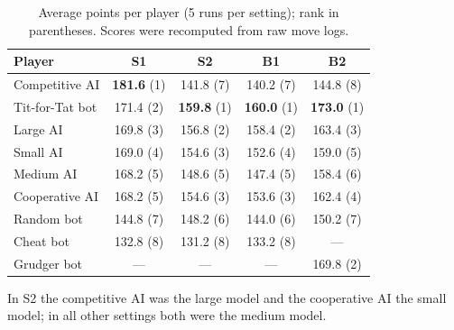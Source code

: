 \documentclass[11pt,a4paper]{article}
\begin{document}
\begin{table}[htbp]
\centering
\caption{Average points per player (5 runs per setting); rank in parentheses. Scores were recomputed from raw move logs.}
\small
\begin{tabular}{@{}lcccc@{}}
\toprule
Player & S1 & S2 & B1 & B2 \\
\midrule
Competitive AI    & \textbf{181.6} (1) & 141.8 (7) & 140.2 (7) & 144.8 (8) \\
Tit-for-Tat bot   & 171.4 (2) & \textbf{159.8} (1) & \textbf{160.0} (1) & \textbf{173.0} (1) \\
Large AI          & 169.8 (3) & 156.8 (2) & 158.4 (2) & 163.4 (3) \\
Small AI          & 169.0 (4) & 154.6 (3) & 152.6 (4) & 159.0 (5) \\
Medium AI         & 168.2 (5) & 148.6 (5) & 147.4 (5) & 158.4 (6) \\
Cooperative AI    & 168.2 (5) & 154.6 (3) & 153.6 (3) & 162.4 (4) \\
Random bot        & 144.8 (7) & 148.2 (6) & 144.0 (6) & 150.2 (7) \\
Cheat bot         & 132.8 (8) & 131.2 (8) & 133.2 (8) & --- \\
Grudger bot       & --- & --- & --- & 169.8 (2) \\
\bottomrule
\end{tabular}
\end{table}

\noindent In S2 the competitive AI was the large model and the cooperative AI the small model; in all other settings both were the medium model.
\end{document}

